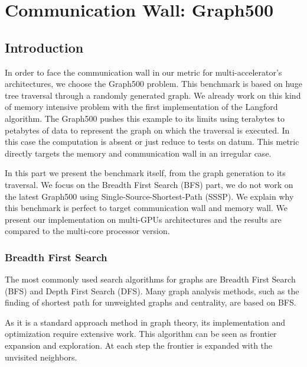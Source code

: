 
\chapter{Communication Wall: Graph500} 

\section{Introduction}
In order to face the communication wall in our metric for multi-accelerator's architectures, we choose the Graph500 problem. 
This benchmark is based on huge tree traversal through a randomly generated graph. 
We already work on this kind of memory intensive problem with the first implementation of the Langford algorithm.
The Graph500 pushes this example to its limits using terabytes to petabytes of data to represent the graph on which the traversal is executed. 
In this case the computation is absent or just reduce to tests on datum.
This metric directly targets the memory and communication wall in an irregular case. 

In this part we present the benchmark itself, from the graph generation to its traversal. 
We focus on the Breadth First Search (BFS) part, we do not work on the latest Graph500 using Single-Source-Shortest-Path (SSSP). 
We explain why this benchmark is perfect to target communication wall and memory wall. 
We present our implementation on multi-GPUs architectures and the results are compared to the multi-core processor version.

\subsection{Breadth First Search}
The most commonly used search algorithms for graphs are Breadth First Search (BFS) and Depth First Search (DFS).
Many graph analysis methods, such as the finding of shortest path for unweighted graphs and centrality, are based on BFS. 

As it is a standard approach method in graph theory, its implementation and optimization require extensive work. 
This algorithm can be seen as frontier expansion and exploration. 
At each step the frontier is expanded with the unvisited neighbors.  

